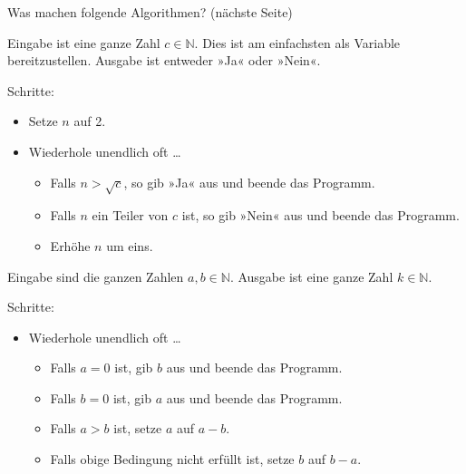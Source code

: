\documentclass{uebungszettel}
\begin{document}
\begin{aufg}
    Was machen folgende Algorithmen? (nächste Seite)

    \begin{algorithm}[H]
        \caption{}
        Eingabe ist eine ganze Zahl $c \in \mathbb N$. Dies ist am einfachsten
        als Variable bereitzustellen. Ausgabe ist entweder »Ja« oder »Nein«.

        Schritte:
        \begin{itemize}
            \item
                Setze $n$ auf 2.
            \item
                Wiederhole unendlich oft …
                \begin{itemize}
                    \item
                        Falls $n > \sqrt c$, so gib »Ja« aus und beende das
                        Programm.
                    \item
                        Falls $n$ ein Teiler von $c$ ist, so gib »Nein« aus und
                        beende das Programm.
                    \item
                        Erhöhe $n$ um eins.
                \end{itemize}
        \end{itemize}
    \end{algorithm}

    \begin{algorithm}[H]
        \caption{}
        Eingabe sind die ganzen Zahlen $a, b \in \mathbb N$. Ausgabe ist eine
        ganze Zahl $k \in \mathbb N$.

        Schritte:
        \begin{itemize}
            \item Wiederhole unendlich oft …
                \begin{itemize}
                    \item
                        Falls $a = 0$ ist, gib $b$ aus und beende das Programm.
                    \item
                        Falls $b = 0$ ist, gib $a$ aus und beende das Programm.
                    \item
                        Falls $a > b$ ist, setze $a$ auf $a - b$.
                    \item
                        Falls obige Bedingung nicht erfüllt ist, setze $b$ auf
                        $b - a$.
                \end{itemize}
        \end{itemize}
    \end{algorithm}


\end{aufg}
\end{document}
